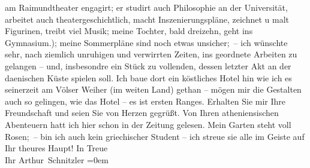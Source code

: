 \begin{ledgroupsized}[t]{13cm}
               am Raimundtheater engagirt; er studirt auch
               Philosophie an der Universität,
               arbeitet auch theatergeschichtlich, macht Inszenierungspläne, zeichnet u malt
               Figurinen, treibt viel Musik; meine Tochter, bald dreizehn, geht ins Gymnasium.); meine
                  Sommer{\pb}pläne sind noch etwas unsicher; – ich
               wünschte sehr, nach ziemlich unruhigen und verwirrten Zeiten, ins geordnete Arbeiten
               zu gelangen – und, insbesondre ein Stück zu vollenden, dessen letzter Akt an der daenischen Küste spielen soll. Ich baue dort ein köstliches
               Hotel hin wie ich es seinerzeit am Völser
                  Weiher (im weiten Land) gethan – mögen
               mir die Gestalten auch so gelingen, wie das Hotel – es ist ersten Ranges.\pend
           \pstart
           Erhalten Sie mir Ihre Freundschaft und seien Sie von Herzen gegrüßt.\pend
           \pstart
           Von Ihren atheniensischen Abenteuern hatt ich
               hier schon in der Zeitung gelesen. Mein Garten steht voll Rosen; – bin ich auch kein
                  griechischer Student – ich streue sie alle
               im Geiste auf Ihr theures Haupt!\pend
           \pstart
           In Treue{\\[\baselineskip]}Ihr \spacefill\mbox{Arthur Schnitzler}\pend
           \leftskip=0em{}
         
         \endnumbering{}\end{ledgroupsized}  \newcommand{\dateiname}{L02387}\newcommand{\titel}{Arthur Schnitzler an Georg Brandes, 7. 6. 1922}\newcommand{\editorInnen}{Martin Anton Müller und Gerd-Hermann Susen}
      